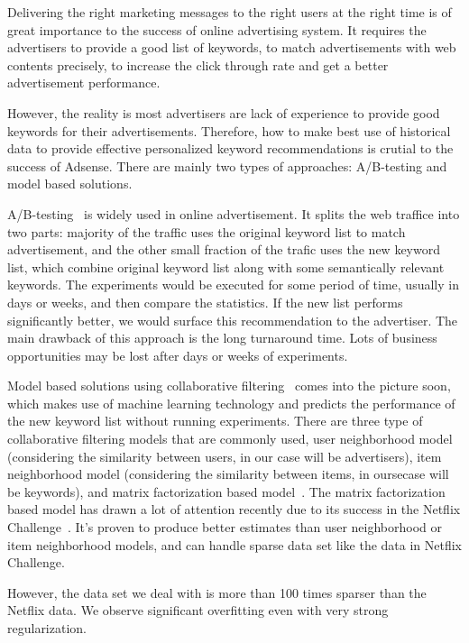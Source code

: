 Delivering the right marketing messages to the right users at the
right time is of great importance to the success of online advertising
system. It requires the advertisers to provide a good list of
keywords, to match advertisements with web contents precisely, to
increase the click through rate and get a better advertisement
performance.

However, the reality is most advertisers are lack of experience to
provide good keywords for their advertisements. Therefore, how to make
best use of historical data to provide effective personalized keyword
recommendations is crutial to the success of Adsense. There are mainly
two types of approaches: A/B-testing and model based solutions.
 
A/B-testing~\cite{abtest:wiki} is widely used in online
advertisement. It splits the web traffice into two parts: majority of
the traffic uses the original keyword list to match advertisement, and
the other small fraction of the trafic uses the new keyword list,
which combine original keyword list along with some semantically
relevant keywords.  The experiments would be executed for some period
of time, usually in days or weeks, and then compare the statistics. If
the new list performs significantly better, we would surface this
recommendation to the advertiser.  The main drawback of this approach
is the long turnaround time. Lots of business opportunities may be
lost after days or weeks of experiments.

Model based solutions using collaborative
filtering~\cite{resnick1997recommender,sarwar2001item} comes into the
picture soon, which makes use of machine learning technology and
predicts the performance of the new keyword list without running
experiments. There are three type of collaborative filtering models
that are commonly used, user neighborhood model (considering the
similarity between users, in our case will be advertisers), item
neighborhood model (considering the similarity between items, in
oursecase will be keywords), and matrix factorization based
model~\cite{}. The matrix factorization based model has drawn a lot of
attention recently due to its success in the Netflix
Challenge~\cite{}. It's proven to produce better estimates than user
neighborhood or item neighborhood models, and can handle sparse data
set like the data in Netflix Challenge.

However, the data set we deal with is more than 100 times sparser than
the Netflix data. We observe significant overfitting even with very
strong regularization.

